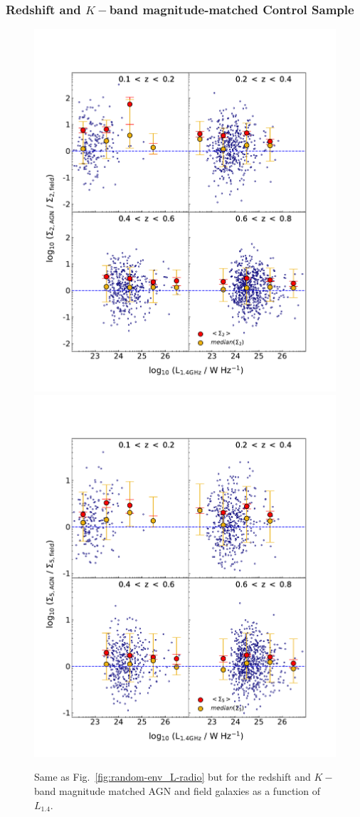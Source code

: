 \subsubsection{Redshift and $K-$band magnitude-matched Control Sample}

\begin{figure}
\hspace*{-50pt}
  \includegraphics[width=0.6\columnwidth]{plots_chp2/env_L_radio_binned_errs_2_control.pdf}
  \includegraphics[width=0.6\columnwidth]{plots_chp2/env_L_radio_binned_errs_5_control.pdf}
  \caption[Sample (ii): Mean and median surface densities, $\Sigma_{2,\rm{R}}$ and $\Sigma_{5,\rm{R}}$ in $L_{1.4}$ bins.]{Same as Fig.~\ref{fig:random-env_L-radio} but for the redshift and $K-$band magnitude matched AGN and field galaxies as a function of $L_{1.4}$.}
  \label{fig:control-env_L_radio}
\end{figure}

